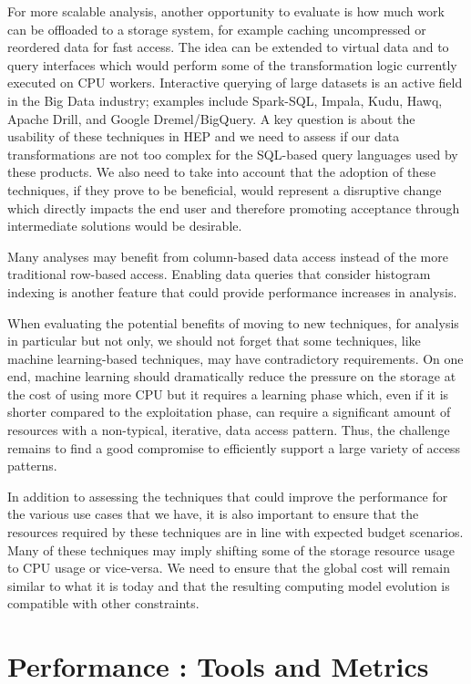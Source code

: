 \documentclass[12pt,a4paper]{article}
\begin{document}
For more scalable analysis, another opportunity to evaluate is how much
work can be offloaded to a storage system, for example caching
uncompressed or reordered data for fast access. The idea can be extended
to virtual data and to query interfaces which would perform some of the
transformation logic currently executed on CPU workers. Interactive
querying of large datasets is an active field in the Big Data industry;
examples include Spark-SQL, Impala, Kudu, Hawq, Apache Drill, and Google
Dremel/BigQuery. A key question is about the usability of these
techniques in HEP and we need to assess if our data transformations are
not too complex for the SQL-based query languages used by these
products. We also need to take into account that the adoption of these
techniques, if they prove to be beneficial, would represent a disruptive
change which directly impacts the end user and therefore promoting
acceptance through intermediate solutions would be desirable.

Many analyses may benefit from column-based data access instead of the
more traditional row-based access. Enabling data queries that consider
histogram indexing is another feature that could provide performance
increases in analysis.

When evaluating the potential benefits of moving to new techniques, for
analysis in particular but not only, we should not forget that some
techniques, like machine learning-based techniques, may have
contradictory requirements. On one end, machine learning should
dramatically reduce the pressure on the storage at the cost of using
more CPU but it requires a learning phase which, even if it is shorter
compared to the exploitation phase, can require a significant amount of
resources with a non-typical, iterative, data access pattern. Thus, the
challenge remains to find a good compromise to efficiently support a
large variety of access patterns.

In addition to assessing the techniques that could improve the
performance for the various use cases that we have, it is also important
to ensure that the resources required by these techniques are in line
with expected budget scenarios. Many of these techniques may imply
shifting some of the storage resource usage to CPU usage or vice-versa.
We need to ensure that the global cost will remain similar to what it is
today and that the resulting computing model evolution is compatible
with other constraints.

\section{Performance : Tools and
Metrics}\label{performance-tools-and-metrics}
\end{document}
